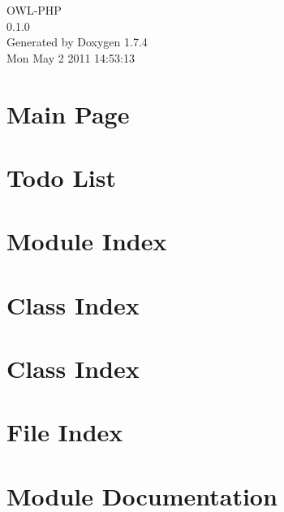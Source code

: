 \documentclass[a4paper]{book}
\begin{document}
\begin{titlepage}
\vspace*{7cm}
\begin{center}
{\Large OWL-\/PHP \\[1ex]\large 0.1.0 }\\
\vspace*{1cm}
{\large Generated by Doxygen 1.7.4}\\
\vspace*{0.5cm}
{\small Mon May 2 2011 14:53:13}\\
\end{center}
\end{titlepage}
\clearemptydoublepage
{}
\tableofcontents
\clearemptydoublepage
{}
\chapter{Main Page}
\label{index}
\chapter{Todo List}
\label{todo}

\chapter{Module Index}

\chapter{Class Index}

\chapter{Class Index}

\chapter{File Index}

\chapter{Module Documentation}






\end{document}
